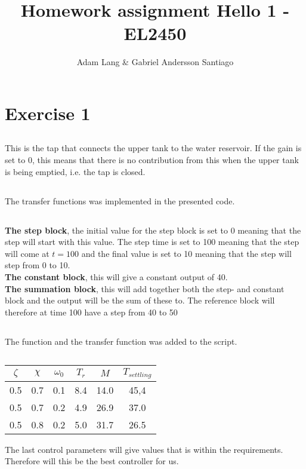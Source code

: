 \documentclass[12pt,a4paper]{article}
\title{Homework assignment Hello 1 - EL2450}
\author{Adam Lang & Gabriel Andersson Santiago}
\begin{document}

\section{Exercise 1}  

  \subsection{}%
  This is the tap that connects the upper tank to the water reservoir.
  If the gain is set to 0, this means that there is no contribution from
  this when the upper tank is being emptied, i.e. the tap is closed.
  
  \subsection{}%
  The transfer functions was implemented in the presented code.
  
  \subsection{}%
  \textbf{The step block}, the initial value for the step block is set to 
  0 meaning that the step will start with this value. The step time is
  set to 100 meaning that the step will come at $t=100$ and the final
  value is set to 10 meaning that the step will step from 0 to 10.\\
  \textbf{The constant block}, this will give a constant output of 40.\\
  \textbf{The summation block}, this will add together both the step-
  and constant block and the output will be the sum of these to. The
  reference block will therefore at time 100 have a step from 40 to 50

  \subsection{}%
  The function and the transfer function was added to the script.

  \subsection{}%
  \begin{center}
    \begin{tabular}{|c | c | c | c | c | c |}
      \hline
      $\zeta$ & $\chi$ & $\omega_0$ & $T_r$ & $M$ & $T_{settling}$ \\
      \hline
      0.5 & 0.7 & 0.1 & 8.4 & 14.0 & 45,4 \\ 
      0.5 & 0.7 & 0.2 & 4.9 & 26.9 & 37.0 \\ 
      0.5 & 0.8 & 0.2 & 5.0 & 31.7 & 26.5 \\ \hline
    \end{tabular}
  \end{center}
  The last control parameters will give values that is within the
  requirements. Therefore will this be the best controller for us. 
\end{document}
